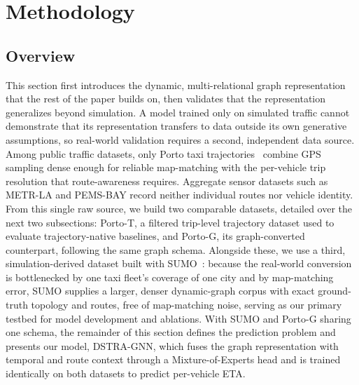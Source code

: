 \section{Methodology}\label{sec3}

\subsection{Overview}\label{sec:methodology-overview}
This section first introduces the dynamic, multi-relational graph representation that the rest of the paper builds on, then validates that the representation generalizes beyond simulation. A model trained only on simulated traffic cannot demonstrate that its representation transfers to data outside its own generative assumptions, so real-world validation requires a second, independent data source. Among public traffic datasets, only Porto taxi trajectories~\cite{moreira2013porto} combine GPS sampling dense enough for reliable map-matching with the per-vehicle trip resolution that route-awareness requires. Aggregate sensor datasets such as METR-LA and PEMS-BAY record neither individual routes nor vehicle identity. From this single raw source, we build two comparable datasets, detailed over the next two subsections: Porto-T, a filtered trip-level trajectory dataset used to evaluate trajectory-native baselines, and Porto-G, its graph-converted counterpart, following the same graph schema. Alongside these, we use a third, simulation-derived dataset built with SUMO~\cite{SUMO2018}: because the real-world conversion is bottlenecked by one taxi fleet's coverage of one city and by map-matching error, SUMO supplies a larger, denser dynamic-graph corpus with exact ground-truth topology and routes, free of map-matching noise, serving as our primary testbed for model development and ablations. With SUMO and Porto-G sharing one schema, the remainder of this section defines the prediction problem and presents our model, DSTRA-GNN, which fuses the graph representation with temporal and route context through a Mixture-of-Experts head and is trained identically on both datasets to predict per-vehicle ETA.

